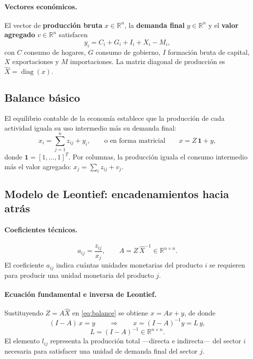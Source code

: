 \documentclass[11pt,a4paper]{article}
\newcommand{\R}{\mathbb{R}}
\newcommand{\diag}{\operatorname{diag}}
\begin{document}
\paragraph{Vectores económicos.}
El vector de \textbf{producción bruta} $x\in\R^{n}$, la \textbf{demanda final}
$y\in\R^{n}$ y el \textbf{valor agregado} $v\in\R^{n}$ satisfacen
\begin{equation}
y_i = C_i + G_i + I_i + X_i - M_i,
\end{equation}
con $C$ consumo de hogares, $G$ consumo de gobierno, $I$ formación bruta de
capital, $X$ exportaciones y $M$ importaciones. La matriz diagonal de producción
es $\hat{X}=\diag(x)$.

\subsection{Balance básico}
El equilibrio contable de la economía establece que la producción de cada
actividad iguala su uso intermedio más su demanda final:
\begin{equation}
x_i = \sum_{j=1}^{n} z_{ij} + y_i, \qquad\text{o en forma matricial}\qquad
x = Z\,\mathbf{1} + y,
\label{eq:balance}
\end{equation}
donde $\mathbf{1}=[1,\dots,1]^{T}$. Por columnas, la producción iguala el
consumo intermedio más el valor agregado: $x_j=\sum_i z_{ij}+v_j$.

\subsection{Modelo de Leontief: encadenamientos hacia atrás}

\paragraph{Coeficientes técnicos.}
\begin{equation}
a_{ij}=\frac{z_{ij}}{x_j}, \qquad A = Z\,\hat{X}^{-1}\in\R^{n\times n}.
\end{equation}
El coeficiente $a_{ij}$ indica cuántas unidades monetarias del producto $i$ se
requieren para producir una unidad monetaria del producto $j$.

\paragraph{Ecuación fundamental e inversa de Leontief.}
Sustituyendo $Z=A\hat{X}$ en \eqref{eq:balance} se obtiene $x = Ax + y$, de donde
\begin{equation}
(I-A)\,x = y \qquad\Longrightarrow\qquad x = (I-A)^{-1}y = L\,y,
\end{equation}
\begin{equation}
L=(I-A)^{-1}\in\R^{n\times n}.
\end{equation}
El elemento $l_{ij}$ representa la producción total —directa e indirecta— del
sector $i$ necesaria para satisfacer una unidad de demanda final del sector $j$.
\end{document}
